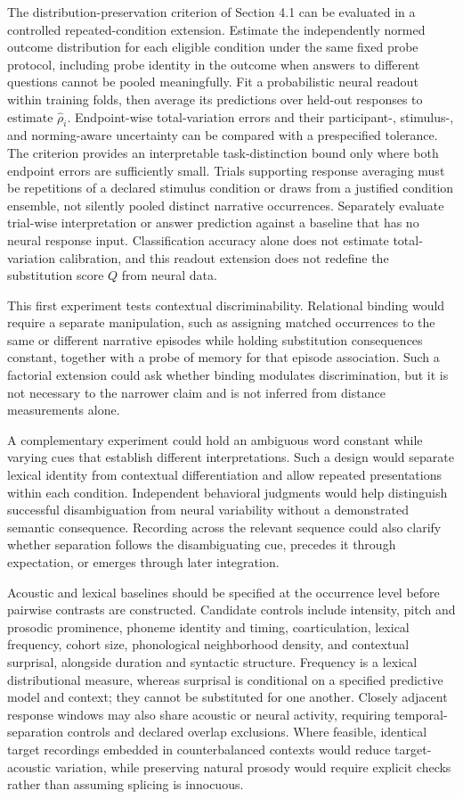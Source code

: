 \documentclass[11pt]{article}
\begin{document}
The distribution-preservation criterion of Section 4.1 can be evaluated
in a controlled repeated-condition extension. Estimate the independently
normed outcome distribution for each eligible condition under the same
fixed probe protocol, including probe identity in the outcome when
answers to different questions cannot be pooled meaningfully. Fit a
probabilistic neural readout within training folds, then average its
predictions over held-out responses to estimate \(\widehat\rho_i\).
Endpoint-wise total-variation errors and their participant-, stimulus-,
and norming-aware uncertainty can be compared with a prespecified
tolerance. The criterion provides an interpretable task-distinction
bound only where both endpoint errors are sufficiently small. Trials
supporting response averaging must be repetitions of a declared stimulus
condition or draws from a justified condition ensemble, not silently
pooled distinct narrative occurrences. Separately evaluate trial-wise
interpretation or answer prediction against a baseline that has no
neural response input. Classification accuracy alone does not estimate
total-variation calibration, and this readout extension does not
redefine the substitution score \(Q\) from neural data.

This first experiment tests contextual discriminability. Relational
binding would require a separate manipulation, such as assigning matched
occurrences to the same or different narrative episodes while holding
substitution consequences constant, together with a probe of memory for
that episode association. Such a factorial extension could ask whether
binding modulates discrimination, but it is not necessary to the
narrower claim and is not inferred from distance measurements alone.

A complementary experiment could hold an ambiguous word constant while
varying cues that establish different interpretations. Such a design
would separate lexical identity from contextual differentiation and
allow repeated presentations within each condition. Independent
behavioral judgments would help distinguish successful disambiguation
from neural variability without a demonstrated semantic consequence.
Recording across the relevant sequence could also clarify whether
separation follows the disambiguating cue, precedes it through
expectation, or emerges through later integration.

Acoustic and lexical baselines should be specified at the occurrence
level before pairwise contrasts are constructed. Candidate controls
include intensity, pitch and prosodic prominence, phoneme identity and
timing, coarticulation, lexical frequency, cohort size, phonological
neighborhood density, and contextual surprisal, alongside duration and
syntactic structure. Frequency is a lexical distributional measure,
whereas surprisal is conditional on a specified predictive model and
context; they cannot be substituted for one another. Closely adjacent
response windows may also share acoustic or neural activity, requiring
temporal-separation controls and declared overlap exclusions. Where
feasible, identical target recordings embedded in counterbalanced
contexts would reduce target-acoustic variation, while preserving
natural prosody would require explicit checks rather than assuming
splicing is innocuous.
\end{document}
